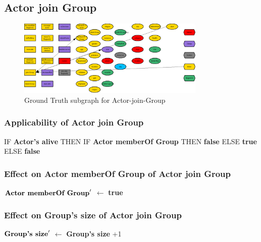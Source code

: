 \documentclass{article}%
\begin{document}
%
\subsection{Actor join Group}%
\label{subsec:Actor join Group}%


\begin{figure}[ht]%
\centering%
\includegraphics[width=0.8\textwidth]{images/Actor-join-Group.png}%
\caption{Ground Truth subgraph for Actor{-}join{-}Group}%
\end{figure}

%
\subsubsection{Applicability of Actor join Group}%
\label{ssubsec:Applicability of Actor join Group}%
\begin{flushleft}%
IF %
\textbf{Actor's alive}%
\linebreak%
\hspace*{2em}%
THEN %
IF %
\textbf{Actor memberOf Group}%
\linebreak%
\hspace*{4em}%
THEN %
\textbf{false}%
\linebreak%
\hspace*{4em}%
ELSE %
\textbf{true}%
\linebreak%
\hspace*{2em}%
ELSE %
\textbf{false}%
\end{flushleft}

%
\subsubsection{Effect on Actor memberOf Group of Actor join Group}%
\label{ssubsec:Effect on Actor memberOf Group of Actor join Group}%
\begin{flushleft}%
$\mbox{\textbf{Actor memberOf Group}} '$%
$\leftarrow$%
\textbf{true}%
\end{flushleft}

%
\subsubsection{Effect on Group's size of Actor join Group}%
\label{ssubsec:Effect on Group's size of Actor join Group}%
\begin{flushleft}%
$\mbox{\textbf{Group's size}} '$%
$\leftarrow$%
\textbf{Group's size}%
+1%
\end{flushleft}
\end{document}
